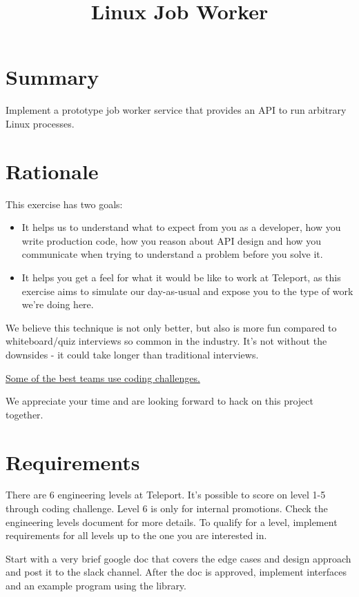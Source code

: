\documentclass{article}
\begin{document}
 
\title{Linux Job Worker}

\section{Summary}
 
Implement a prototype job worker service that provides an API to run arbitrary Linux processes.

\section{Rationale}
 
    This exercise has two goals:

    \begin{itemize} %
      \item It helps us to understand what to expect from you as a developer, how you write production code, how you reason about API design and how you communicate when trying to understand a problem before you solve it.
      \item It helps you get a feel for what it would be like to work at Teleport, as this exercise aims to simulate our day-as-usual and expose you to the type of work we're doing here.
    \end{itemize}

    We believe this technique is not only better, but also is more fun compared to whiteboard/quiz interviews so common in the industry.  It's not without the downsides - it could take longer than traditional interviews.

    \par

    \href{https://sockpuppet.org/blog/2015/03/06/the-hiring-post/}{Some of the best teams use coding challenges.}

    We appreciate your time and are looking forward to hack on this project together.

\section{Requirements} 

  There are 6 engineering levels at Teleport. It's possible to score on level 1-5 through coding challenge.
  Level 6 is only for internal promotions. Check the engineering levels document for more details.
  To qualify for a level, implement requirements for all levels up to the one you are interested in.

  Start with a very brief google doc that covers the edge cases and design approach and post it to the slack channel. After the doc is approved, implement interfaces and an example program using the library.
\end{document}
